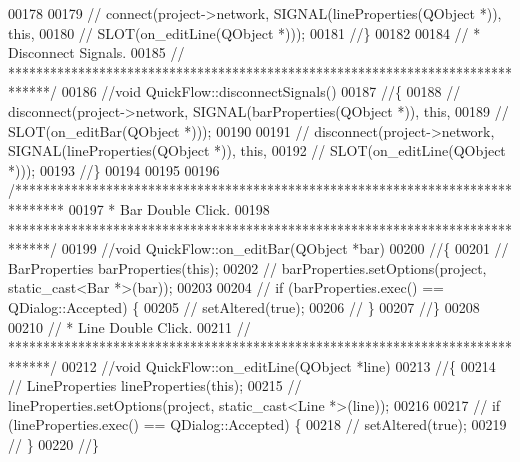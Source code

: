 \begin{DoxyCode}
00178 
00179 \textcolor{comment}{//  connect(project->network, SIGNAL(lineProperties(QObject *)), this,}
00180 \textcolor{comment}{//          SLOT(on\_editLine(QObject *)));}
00181 \textcolor{comment}{//\}}
00182 
00184 \textcolor{comment}{// * Disconnect Signals.}
00185 \textcolor{comment}{// ******************************************************************************/}
00186 \textcolor{comment}{//void QuickFlow::disconnectSignals()}
00187 \textcolor{comment}{//\{}
00188 \textcolor{comment}{//  disconnect(project->network, SIGNAL(barProperties(QObject *)), this,}
00189 \textcolor{comment}{//             SLOT(on\_editBar(QObject *)));}
00190 
00191 \textcolor{comment}{//  disconnect(project->network, SIGNAL(lineProperties(QObject *)), this,}
00192 \textcolor{comment}{//             SLOT(on\_editLine(QObject *)));}
00193 \textcolor{comment}{//\}}
00194 
00195 
00196 \textcolor{comment}{/*******************************************************************************}
00197 \textcolor{comment}{ * Bar Double Click.}
00198 \textcolor{comment}{ ******************************************************************************/}
00199 \textcolor{comment}{//void QuickFlow::on\_editBar(QObject *bar)}
00200 \textcolor{comment}{//\{}
00201 \textcolor{comment}{//  BarProperties barProperties(this);}
00202 \textcolor{comment}{//  barProperties.setOptions(project, static\_cast<Bar *>(bar));}
00203 
00204 \textcolor{comment}{//  if (barProperties.exec() == QDialog::Accepted) \{}
00205 \textcolor{comment}{//    setAltered(true);}
00206 \textcolor{comment}{//  \}}
00207 \textcolor{comment}{//\}}
00208 
00210 \textcolor{comment}{// * Line Double Click.}
00211 \textcolor{comment}{// ******************************************************************************/}
00212 \textcolor{comment}{//void QuickFlow::on\_editLine(QObject *line)}
00213 \textcolor{comment}{//\{}
00214 \textcolor{comment}{//  LineProperties lineProperties(this);}
00215 \textcolor{comment}{//  lineProperties.setOptions(project, static\_cast<Line *>(line));}
00216 
00217 \textcolor{comment}{//  if (lineProperties.exec() == QDialog::Accepted) \{}
00218 \textcolor{comment}{//    setAltered(true);}
00219 \textcolor{comment}{//  \}}
00220 \textcolor{comment}{//\}}
\end{DoxyCode}

